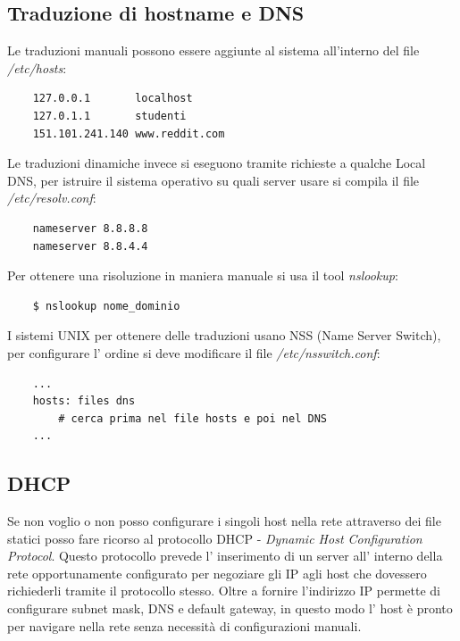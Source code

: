 \subsection{Traduzione di hostname e DNS}
Le traduzioni manuali possono essere aggiunte al sistema all'interno del file \emph{/etc/hosts}:
\begin{verbatim}
    127.0.0.1       localhost
    127.0.1.1       studenti
    151.101.241.140 www.reddit.com
\end{verbatim}

Le traduzioni dinamiche invece si eseguono tramite richieste a qualche Local DNS, per istruire il sistema operativo su quali server usare si compila il file \emph{/etc/resolv.conf}:
\begin{verbatim}
    nameserver 8.8.8.8
    nameserver 8.8.4.4
\end{verbatim}

Per ottenere una risoluzione in maniera manuale si usa il tool \emph{nslookup}:
\begin{verbatim}
    $ nslookup nome_dominio
\end{verbatim}
I sistemi UNIX per ottenere delle traduzioni usano NSS (Name Server Switch), per configurare l' ordine si deve modificare il file \emph{/etc/nsswitch.conf}:
\begin{verbatim}
    ...
    hosts: files dns
        # cerca prima nel file hosts e poi nel DNS
    ...
\end{verbatim}

\subsection{DHCP}
Se non voglio o non posso configurare i singoli host nella rete attraverso dei file statici posso fare ricorso al protocollo DHCP - \emph{Dynamic Host Configuration Protocol}.
Questo protocollo prevede l' inserimento di un server all' interno della rete opportunamente configurato per negoziare gli IP agli host che dovessero richiederli tramite il protocollo stesso.
Oltre a fornire l'indirizzo IP permette di configurare subnet mask, DNS e default gateway, in questo modo l' host è pronto per navigare nella rete senza necessità di configurazioni manuali. 

